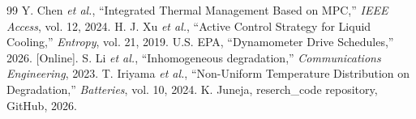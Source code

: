 \documentclass[twocolumn]{article}
\begin{document}
\begin{thebibliography}{99}
 Y. Chen \textit{et al.}, ``Integrated Thermal Management Based on MPC,'' \textit{IEEE Access}, vol. 12, 2024.
 H. J. Xu \textit{et al.}, ``Active Control Strategy for Liquid Cooling,'' \textit{Entropy}, vol. 21, 2019.
 U.S. EPA, ``Dynamometer Drive Schedules,'' 2026. [Online].
 S. Li \textit{et al.}, ``Inhomogeneous degradation,'' \textit{Communications Engineering}, 2023.
 T. Iriyama \textit{et al.}, ``Non-Uniform Temperature Distribution on Degradation,'' \textit{Batteries}, vol. 10, 2024.
 K. Juneja, reserch\_code repository, GitHub, 2026.
\end{thebibliography}
\end{document}
